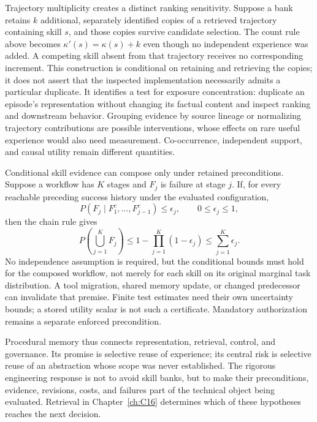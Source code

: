 Trajectory multiplicity creates a distinct ranking sensitivity. Suppose a bank retains $k$ additional, separately identified copies of a retrieved trajectory containing skill $s$, and those copies survive candidate selection. The count rule above becomes $\kappa'(s)=\kappa(s)+k$ even though no independent experience was added. A competing skill absent from that trajectory receives no corresponding increment. This construction is conditional on retaining and retrieving the copies; it does not assert that the inspected implementation necessarily admits a particular duplicate. It identifies a test for exposure concentration: duplicate an episode's representation without changing its factual content and inspect ranking and downstream behavior. Grouping evidence by source lineage or normalizing trajectory contributions are possible interventions, whose effects on rare useful experience would also need measurement. Co-occurrence, independent support, and causal utility remain different quantities.

Conditional skill evidence can compose only under retained preconditions. Suppose a workflow has $K$ stages and $F_j$ is failure at stage $j$. If, for every reachable preceding success history under the evaluated configuration,
\begin{equation}
 P(F_j\mid F_1^c,\ldots,F_{j-1}^c)\leq\epsilon_j,
 \qquad 0\leq\epsilon_j\leq1,
\end{equation}
then the chain rule gives
\begin{equation}
 P\!\left(\bigcup_{j=1}^{K}F_j\right)
 \leq1-\prod_{j=1}^{K}(1-\epsilon_j)
 \leq\sum_{j=1}^{K}\epsilon_j.
\end{equation}
No independence assumption is required, but the conditional bounds must hold for the composed workflow, not merely for each skill on its original marginal task distribution. A tool migration, shared memory update, or changed predecessor can invalidate that premise. Finite test estimates need their own uncertainty bounds; a stored utility scalar is not such a certificate. Mandatory authorization remains a separate enforced precondition.

Procedural memory thus connects representation, retrieval, control, and governance. Its promise is selective reuse of experience; its central risk is selective reuse of an abstraction whose scope was never established. The rigorous engineering response is not to avoid skill banks, but to make their preconditions, evidence, revisions, costs, and failures part of the technical object being evaluated. Retrieval in Chapter~\ref{ch:C16} determines which of these hypotheses reaches the next decision.
